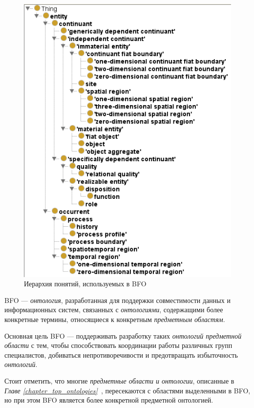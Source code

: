 \begin{figure}[H]
	\includegraphics[scale=0.6]{author/part2/figures/chapter_kb/bfo.png}
	\caption{Иерархия понятий, используемых в BFO}
	\label{fig:bfo}
\end{figure}

BFO --- \textit{онтология}, разработанная для поддержки совместимости данных и информационных систем, связанных с \textit{онтологиями}, содержащими более конкретные термины, относящиеся к конкретным \textit{предметным областям}.

Основная цель BFO --- поддерживать разработку таких \textit{онтологий предметной области} с тем, чтобы способствовать координации работы различных групп специалистов, добиваться непротиворечивости и предотвращать избыточность \textit{онтологий}.

Стоит отметить, что многие \textit{предметные области и онтологии}, описанные в \textit{Главе \ref{chapter_top_ontologies}~}, пересекаются с областями выделенными в BFO, но при этом BFO является более конкретной предметной онтологией. 

